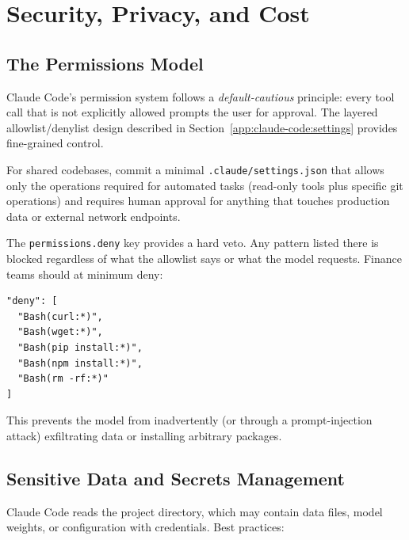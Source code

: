 \section{Security, Privacy, and Cost}
\label{app:claude-code:security}

\subsection{The Permissions Model}
\label{app:claude-code:permissions}

Claude Code's permission system follows a \emph{default-cautious} principle:
every tool call that is not explicitly allowed prompts the user for approval.
The layered allowlist/denylist design described in
Section~\ref{app:claude-code:settings} provides fine-grained control.

For shared codebases, commit a minimal \texttt{.claude/settings.json} that
allows only the operations required for automated tasks (read-only tools plus
specific git operations) and requires human approval for anything that touches
production data or external network endpoints.

The \texttt{permissions.deny} key provides a hard veto.  Any pattern listed
there is blocked regardless of what the allowlist says or what the model
requests.  Finance teams should at minimum deny:

\begin{verbatim}
"deny": [
  "Bash(curl:*)",
  "Bash(wget:*)",
  "Bash(pip install:*)",
  "Bash(npm install:*)",
  "Bash(rm -rf:*)"
]
\end{verbatim}

This prevents the model from inadvertently (or through a prompt-injection
attack) exfiltrating data or installing arbitrary packages.

\subsection{Sensitive Data and Secrets Management}
\label{app:claude-code:secrets}

Claude Code reads the project directory, which may contain data files, model
weights, or configuration with credentials.  Best practices:

